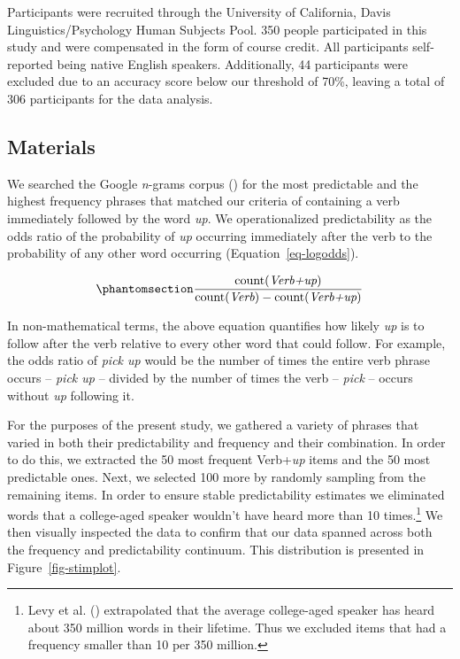 \documentclass[
  12pt,
  letterpaper,
]{scrreprt}
\begin{document}
Participants were recruited through the University of California, Davis
Linguistics/Psychology Human Subjects Pool. 350 people participated in
this study and were compensated in the form of course credit. All
participants self-reported being native English speakers. Additionally,
44 participants were excluded due to an accuracy score below our
threshold of 70\%, leaving a total of 306 participants for the data
analysis.

\subsection{Materials}\label{materials-2}

We searched the Google \emph{n}-grams corpus
() for
the most predictable and the highest frequency phrases that matched our
criteria of containing a verb immediately followed by the word
\emph{up}. We operationalized predictability as the odds ratio of the
probability of \emph{up} occurring immediately after the verb to the
probability of any other word occurring (Equation~\ref{eq-logodds}).

\begin{equation}\phantomsection\label{eq-logodds}{
\frac{\mathrm{count(\textit{Verb+up})}}{\mathrm{count(\textit{Verb})} - \mathrm{count(\textit{Verb+up})}} 
}\end{equation}

In non-mathematical terms, the above equation quantifies how likely
\emph{up} is to follow after the verb relative to every other word that
could follow. For example, the odds ratio of \emph{pick up} would be the
number of times the entire verb phrase occurs -- \emph{pick up} --
divided by the number of times the verb -- \emph{pick} -- occurs without
\emph{up} following it.

For the purposes of the present study, we gathered a variety of phrases
that varied in both their predictability and frequency and their
combination. In order to do this, we extracted the 50 most frequent
Verb+\emph{up} items and the 50 most predictable ones. Next, we selected
100 more by randomly sampling from the remaining items. In order to
ensure stable predictability estimates we eliminated words that a
college-aged speaker wouldn't have heard more than 10 times.\footnote{Levy
  et al. ()
  extrapolated that the average college-aged speaker has heard about 350
  million words in their lifetime. Thus we excluded items that had a
  frequency smaller than 10 per 350 million.} We then visually inspected
the data to confirm that our data spanned across both the frequency and
predictability continuum. This distribution is presented in
Figure~\ref{fig-stimplot}.
\end{document}

